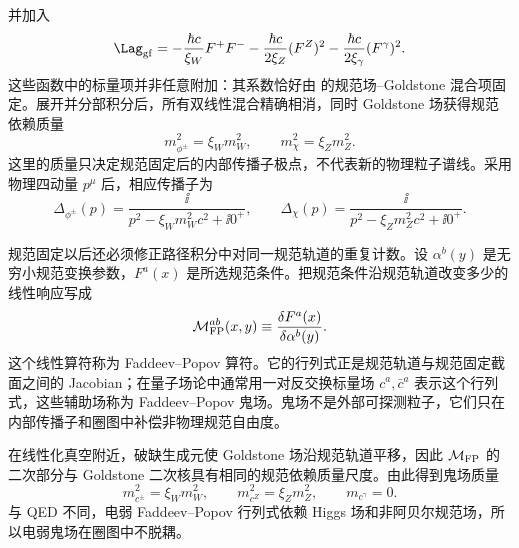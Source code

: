 并加入
\begin{equation}
 {
 \Lag_{\rm gf}
 =-\frac{\hbar c}{\xi_W}F^+F^-
 -\frac{\hbar c}{2\xi_Z}(F^Z)^2
 -\frac{\hbar c}{2\xi_\gamma}(F^\gamma)^2.}
 \label{eq:sm-rxi-gf-lagrangian-dp11}
\end{equation}
这些函数中的标量项并非任意附加：其系数恰好由 的规范场--Goldstone 混合项固定。展开并分部积分后，所有双线性混合精确相消，同时 Goldstone 场获得规范依赖质量
\begin{equation}
 {
 m_{\phi^\pm}^2=\xi_Wm_W^2,
 \qquad
 m_{\chi}^2=\xi_Zm_Z^2.}
 \label{eq:sm-rxi-goldstone-masses-dp11}
\end{equation}
这里的质量只决定规范固定后的内部传播子极点，不代表新的物理粒子谱线。采用物理四动量 $p^\mu$ 后，相应传播子为
\begin{equation*}
 \Delta_{\phi^\pm}(p)
 =\frac{\ii}{p^2-\xi_Wm_W^2c^2+\ii0^+},
 \qquad
 \Delta_{\chi}(p)
 =\frac{\ii}{p^2-\xi_Zm_Z^2c^2+\ii0^+}.
\end{equation*}

规范固定以后还必须修正路径积分中对同一规范轨道的重复计数。设 $\alpha^b(y)$ 是无穷小规范变换参数，$F^a(x)$ 是所选规范条件。把规范条件沿规范轨道改变多少的线性响应写成
\begin{equation*}
 \mathcal M_{\rm FP}^{ab}(x,y)
 \equiv
 \frac{\delta F^a(x)}{\delta\alpha^b(y)}.
\end{equation*}
这个线性算符称为 Faddeev--Popov 算符。它的行列式正是规范轨道与规范固定截面之间的 Jacobian；在量子场论中通常用一对反交换标量场 $c^a,\bar c^a$ 表示这个行列式，这些辅助场称为 Faddeev--Popov 鬼场。鬼场不是外部可探测粒子，它们只在内部传播子和圈图中补偿非物理规范自由度。

在线性化真空附近，破缺生成元使 Goldstone 场沿规范轨道平移，因此 $\mathcal M_{\rm FP}$ 的二次部分与 Goldstone 二次核具有相同的规范依赖质量尺度。由此得到鬼场质量
\begin{equation}
 {
 m_{c^\pm}^2=\xi_Wm_W^2,
 \qquad
 m_{c^Z}^2=\xi_Zm_Z^2,
 \qquad
 m_{c^\gamma}=0.}
 \label{eq:sm-rxi-ghost-masses-dp11}
\end{equation}
与 QED 不同，电弱 Faddeev--Popov 行列式依赖 Higgs 场和非阿贝尔规范场，所以电弱鬼场在圈图中不脱耦。

